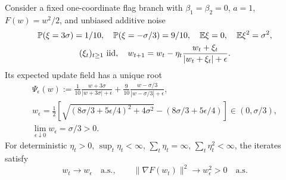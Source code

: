 \begin{proposition}\label{prop:actual-skew-counterexample}
Consider a fixed one-coordinate flag branch with $\beta_1=\beta_2=0$, $a=1$,
$F(w)=w^2/2$, and unbiased additive noise
\begin{gather}
 \mathbb P(\xi=3\sigma)=1/10,\quad\mathbb P(\xi=-\sigma/3)=9/10,\quad
 \mathbb E\xi=0,\quad\mathbb E\xi^2=\sigma^2,\\
 (\xi_t)_{t\ge1}\text{ iid},\quad w_{t+1}=w_t-\eta_t\frac{w_t+\xi_t}{|w_t+\xi_t|+\epsilon}.
\end{gather}
Its expected update field has a unique root
\begin{gather}
 \Psi_\epsilon(w):=\frac1{10}\frac{w+3\sigma}{|w+3\sigma|+\epsilon}
 +\frac9{10}\frac{w-\sigma/3}{|w-\sigma/3|+\epsilon},\\
 w_\epsilon=\tfrac12\left[
 \sqrt{(8\sigma/3+5\epsilon/4)^2+4\sigma^2}
                      -(8\sigma/3+5\epsilon/4)\right]\in(0,\sigma/3),\\
 \lim_{\epsilon\downarrow0}w_\epsilon=\sigma/3>0.
\end{gather}
For deterministic $\eta_t>0$, $\sup_t\eta_t<\infty$,
$\sum_t\eta_t=\infty$, $\sum_t\eta_t^2<\infty$, the iterates satisfy
\begin{equation}
 w_t\longrightarrow w_\epsilon\quad\text{a.s.},\qquad
 \|\nabla F(w_t)\|^2\longrightarrow w_\epsilon^2>0\quad\text{a.s.}
\end{equation}
\end{proposition}
